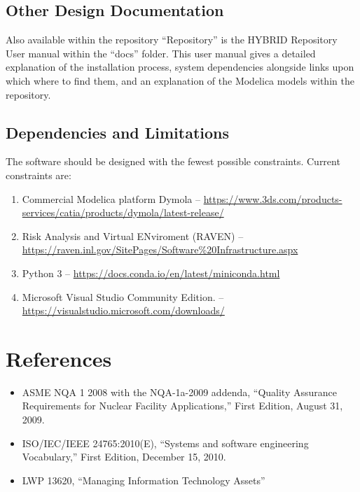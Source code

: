 
\subsection{Other Design Documentation}
Also available within the repository ``Repository'' is the HYBRID Repository User manual within the “docs” folder. This user manual gives a detailed explanation of the installation process, system dependencies alongside links upon which where to find them, and an explanation of the Modelica models within the repository. 

\subsection{Dependencies and Limitations}
The software should be designed with the fewest possible constraints. 
Current constraints are:
\begin{enumerate}
\item Commercial Modelica platform Dymola -- \url{https://www.3ds.com/products-services/catia/products/dymola/latest-release/}

 \item Risk Analysis and Virtual ENviroment (RAVEN) -- \url{https://raven.inl.gov/SitePages/Software%20Infrastructure.aspx}
 
 \item Python 3 -- \url{https://docs.conda.io/en/latest/miniconda.html}
 
 \item Microsoft Visual Studio Community Edition. -- \url{https://visualstudio.microsoft.com/downloads/}
 \end{enumerate} 

\section{References}

\begin{itemize}

  \item ASME NQA 1 2008 with the NQA-1a-2009 addenda, ``Quality Assurance Requirements for Nuclear Facility Applications,'' First Edition, August 31, 2009.
  \item ISO/IEC/IEEE 24765:2010(E), ``Systems and software engineering Vocabulary,'' First Edition, December 15, 2010.
  \item LWP 13620, ``Managing Information Technology Assets''
\end{itemize}


